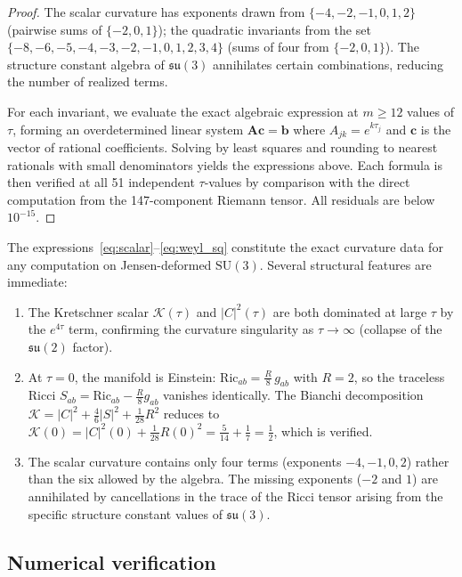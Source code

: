 \documentclass[12pt]{article}
\theoremstyle{definition}
\theoremstyle{remark}
\begin{document}
\begin{proof}
The scalar curvature has exponents drawn from $\{-4,-2,-1,0,1,2\}$ (pairwise sums of $\{-2,0,1\}$); the quadratic invariants from the set $\{-8,-6,-5,-4,-3,-2,-1,0,1,2,3,4\}$ (sums of four from $\{-2,0,1\}$).  The structure constant algebra of $\mathfrak{su}(3)$ annihilates certain combinations, reducing the number of realized terms.

For each invariant, we evaluate the exact algebraic expression at $m\geq 12$ values of $\tau$, forming an overdetermined linear system $\mathbf{A}\mathbf{c}=\mathbf{b}$ where $A_{jk}=e^{k\tau_j}$ and $\mathbf{c}$ is the vector of rational coefficients.  Solving by least squares and rounding to nearest rationals with small denominators yields the expressions above.  Each formula is then verified at all 51 independent $\tau$-values by comparison with the direct computation from the 147-component Riemann tensor.  All residuals are below $10^{-15}$.
\end{proof}

The expressions~\eqref{eq:scalar}--\eqref{eq:weyl_sq} constitute the exact curvature data for any computation on Jensen-deformed $\mathrm{SU}(3)$.  Several structural features are immediate:

\begin{enumerate}
    \item The Kretschner scalar $\mathcal{K}(\tau)$ and $|C|^2(\tau)$ are both dominated at large $\tau$ by the $e^{4\tau}$ term, confirming the curvature singularity as $\tau\to\infty$ (collapse of the $\mathfrak{su}(2)$ factor).
    \item At $\tau=0$, the manifold is Einstein: $\mathrm{Ric}_{ab}=\tfrac{R}{8}\,g_{ab}$ with $R=2$, so the traceless Ricci $S_{ab}=\mathrm{Ric}_{ab}-\tfrac{R}{8}g_{ab}$ vanishes identically.  The Bianchi decomposition $\mathcal{K}=|C|^2+\tfrac{4}{6}|S|^2+\tfrac{1}{28}R^2$ reduces to $\mathcal{K}(0)=|C|^2(0)+\tfrac{1}{28}R(0)^2=\tfrac{5}{14}+\tfrac{1}{7}=\tfrac{1}{2}$, which is verified.
    \item The scalar curvature contains only four terms (exponents $-4,-1,0,2$) rather than the six allowed by the algebra.  The missing exponents ($-2$ and $1$) are annihilated by cancellations in the trace of the Ricci tensor arising from the specific structure constant values of $\mathfrak{su}(3)$.
\end{enumerate}

\subsection{Numerical verification}
\end{document}
